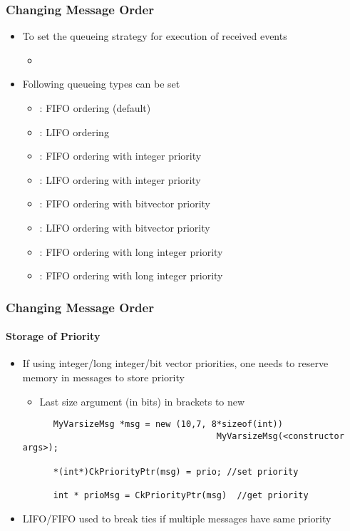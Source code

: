\begin{frame}[fragile]
  \frametitle{Changing Message Order}
  \begin{itemize}
    \item To set the queueing strategy for execution of received events
    \begin{itemize}
      \item {}
    \end{itemize}
    \item Following queueing types can be set
    \begin{itemize}
      \item {} : FIFO ordering (default)
      \item {} : LIFO ordering
      \item {} : FIFO ordering with integer priority
      \item {} : LIFO ordering with integer priority
      \item {} : FIFO ordering with bitvector priority
      \item {} : LIFO ordering with bitvector priority
      \item {} : FIFO ordering with long integer priority
      \item {} : FIFO ordering with long integer priority
    \end{itemize}
 \end{itemize}
\end{frame}

\begin{frame}[fragile]
  \frametitle{Changing Message Order}
  \framesubtitle{Storage of Priority}
  \begin{itemize}
    \item If using integer/long integer/bit vector priorities, one needs to reserve memory in messages to store priority
     \begin{itemize}
       \item Last size argument (in bits) in brackets to new
     \end{itemize}
    \begin{lstlisting}
      MyVarsizeMsg *msg = new (10,7, 8*sizeof(int))         
                                      MyVarsizeMsg(<constructor args>);

      *(int*)CkPriorityPtr(msg) = prio; //set priority

      int * prioMsg = CkPriorityPtr(msg)  //get priority
    \end{lstlisting}
    \item LIFO/FIFO used to break ties if multiple messages have same priority
  \end{itemize}
\end{frame}

